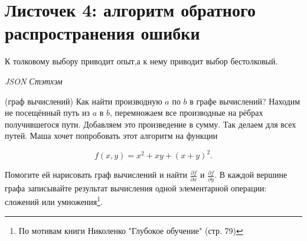 
\section*{Листочек 4: алгоритм обратного распространения ошибки}


\epigraph{К толковому выбору приводит опыт,а к нему приводит выбор бестолковый.}{\textit{JSON Стэтхэм}}


\begin{problem}{(граф вычислений)}
    Как найти производную $a$ по $b$ в графе вычислений? Находим не посещённый путь из $a$ в $b$, перемножаем все производные на рёбрах получившегося пути. Добавляем это произведение в сумму. Так делаем для всех путей. Маша хочет попробовать этот алгоритм на функции
    
    $$
    f(x,y) = x^2 + xy + (x + y)^2.
    $$ 
    
    Помогите ей нарисовать граф вычислений и найти $\frac{\partial f}{\partial x}$ и $\frac{\partial f}{\partial y}.$ В каждой вершине графа записывайте результат вычисления одной элементарной операции: сложений или умножения\footnote{По мотивам книги Николенко "Глубокое обучение" (стр. 79)}.
\end{problem} 

